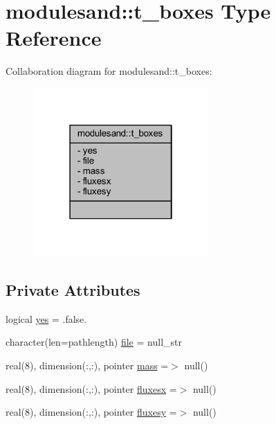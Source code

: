 \hypertarget{structmodulesand_1_1t__boxes}{}\section{modulesand\+:\+:t\+\_\+boxes Type Reference}
\label{structmodulesand_1_1t__boxes}


Collaboration diagram for modulesand\+:\+:t\+\_\+boxes\+:\nopagebreak
\begin{figure}[H]
\begin{center}
\leavevmode
\includegraphics[width=190pt]{structmodulesand_1_1t__boxes__coll__graph}
\end{center}
\end{figure}
\subsection*{Private Attributes}
\begin{DoxyCompactItemize}
\item 
logical \mbox{\hyperlink{structmodulesand_1_1t__boxes_a4e9a10d4635fd7dc7f7a8c0d460bb57b}{yes}} = .false.
\item 
character(len=pathlength) \mbox{\hyperlink{structmodulesand_1_1t__boxes_a463ff74fb0d0989c2b4c75ffc458e66a}{file}} = null\+\_\+str
\item 
real(8), dimension(\+:,\+:), pointer \mbox{\hyperlink{structmodulesand_1_1t__boxes_a39ae986682c2876f69d47326be055cd9}{mass}} =$>$ null()
\item 
real(8), dimension(\+:,\+:), pointer \mbox{\hyperlink{structmodulesand_1_1t__boxes_abf4036e35a9ea20b92cad3f2344e3335}{fluxesx}} =$>$ null()
\item 
real(8), dimension(\+:,\+:), pointer \mbox{\hyperlink{structmodulesand_1_1t__boxes_a34800605409d1d7605474197567cfd67}{fluxesy}} =$>$ null()
\end{DoxyCompactItemize}


